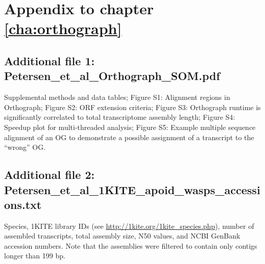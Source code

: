 \chapter{Appendix to chapter \ref{cha:orthograph}}

  \section{Additional file 1: Petersen\_et\_al\_Orthograph\_SOM.pdf}
		Supplemental methods and data tables;
		Figure S1: Alignment regions in Orthograph;
		Figure S2: ORF extension criteria;
		Figure S3: Orthograph runtime is significantly correlated to total transcriptome assembly length;
		Figure S4: Speedup plot for multi-threaded analysis;
		Figure S5: Example multiple sequence alignment of an OG to demonstrate a possible assignment of a transcript to the ``wrong'' OG.

	\section{Additional file 2: Petersen\_et\_al\_1KITE\_apoid\_wasps\_accessions.txt}
		Species, 1KITE library IDs (see \url{http://1kite.org/1kite_species.php}),
		number of assembled transcripts, total assembly size, N50 values, and NCBI
		GenBank accession numbers. Note that the assemblies were filtered to
		contain only contigs longer than 199 bp.

